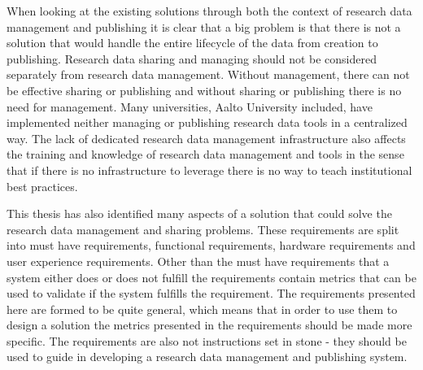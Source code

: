 When looking at the existing solutions through both the context of research
data management and publishing it is clear that a big problem is that there
is not a solution that would handle the entire lifecycle of the data from
creation to publishing. Research data sharing and managing should not be considered
separately from research data management. Without management, there can not be
effective sharing or publishing and without sharing or publishing there is no
need for management. Many universities, Aalto University included, have
implemented neither managing or publishing research data tools in a centralized
way. The lack of dedicated research data management
infrastructure also affects the training and knowledge of research data
management and tools in the sense that if there is no infrastructure to
leverage there is no way to teach institutional best practices.

\clearpage

This thesis has also identified many aspects of a solution that could solve the
research data management and sharing problems. These requirements are split into
must have requirements, functional requirements, hardware requirements and
user experience requirements. Other than the must have requirements that a
system either does or does not fulfill the requirements contain metrics that
can be used to validate if the system fulfills the requirement. The
requirements presented here are formed to be quite general,
which means that in order to use them to design a solution the metrics
presented in the requirements should be made more specific. The requirements
are also not instructions set in stone - they should be used to guide in
developing a research data management and publishing system.

